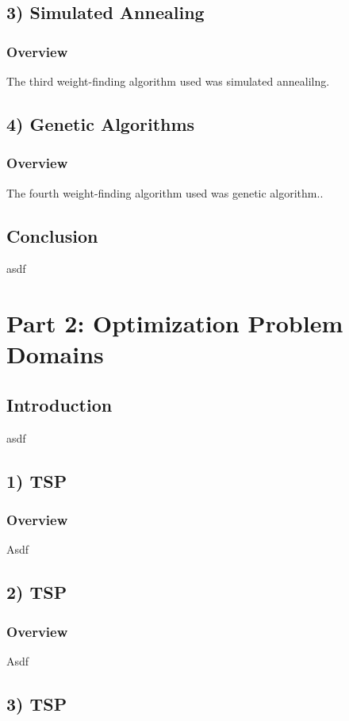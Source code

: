 \documentclass[h]{article}
\begin{document}
\subsection*{3) Simulated Annealing}  
\subsubsection*{Overview}
The third weight-finding algorithm used was simulated annealilng.

\subsection*{4) Genetic Algorithms}  
\subsubsection*{Overview}
The fourth weight-finding algorithm used was genetic algorithm..

\subsection*{ Conclusion}  
asdf

\section*{Part 2: Optimization Problem Domains}
\subsection*{ Introduction}  
asdf

\subsection*{1) TSP}  
\subsubsection*{Overview}
Asdf

\subsection*{2) TSP}  
\subsubsection*{Overview}
Asdf

\subsection*{3) TSP}  
\end{document}
